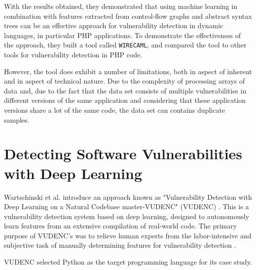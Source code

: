 With the results obtained, they demonstrated that using machine learning in combination with features extracted from control-flow graphs and abstract syntax trees can be an effective approach for vulnerability detection in dynamic languages, in particular PHP applications. To demonstrate the effectiveness of the approach, they built a tool called \texttt{WIRECAML}, and compared the tool to other tools for vulnerability detection in PHP code.

However, the tool does exhibit a number of limitations, both in aspect of inherent and in aspect of technical nature. Due to the complexity of processing arrays of data and, due to the fact that the data set consists of multiple vulnerabilities in different versions of the same application and considering that these application versions share a lot of the same code, the data set can contains duplicate samples.



\section{Detecting Software Vulnerabilities with Deep Learning} %
\label{sec:	Detecting_Software_Vulnerabilities_with_Deep_Learning}

Wartschinski et al. introduce an approach known as "Vulnerability Detection with Deep Learning on a Natural Codebase master-VUDENC" (VUDENC) \cite{Wartschinski2019}. This is a vulnerability detection system based on deep learning, designed to autonomously learn features from an extensive compilation of real-world code.
The primary purpose of VUDENC’s was to relieve human experts from the labor-intensive and subjective task of manually determining features for vulnerability detection \cite{Wartschinski2019}. 

VUDENC selected Python as the target programming language for its case study.

